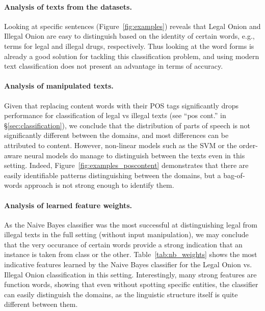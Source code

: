 \documentclass[11pt,a4paper,table]{article}
\begin{document}
  \paragraph{Analysis of texts from the datasets.}

    Looking at specific sentences (Figure~\ref{fig:examples})
    reveals that Legal Onion and Illegal Onion are easy to distinguish
    based on the identity of certain words, e.g., terms for legal and illegal drugs,
    respectively.
    Thus looking at the word forms is already a good solution for tackling this
    classification problem,
    and using modern text classification does not present an advantage in
    terms of accuracy.

  \paragraph{Analysis of manipulated texts.}

    Given that replacing content words with their POS tags significantly drops
    performance for classification of legal vs illegal texts
    (see ``pos cont.'' in \S\ref{sec:classification}),
    we conclude that the distribution of parts of speech is not significantly
    different between the domains,
    and most differences can be attributed to content.
    However, non-linear models such as the SVM or the order-aware neural models
    do manage to distinguish between the texts even in this setting.
    Indeed, Figure~\ref{fig:examples_poscontent} demonstrates that
    there are easily identifiable patterns distinguishing between the domains,
    but a bag-of-words approach is not strong enough to identify them. 

  \paragraph{Analysis of learned feature weights.}

    As the Naive Bayes classifier was the most successful at distinguishing
    legal from illegal texts in the full setting (without input manipulation),
    we may conclude that the very occurance of certain words provide a strong indication
    that an instance is taken from class or the other.
    Table~\ref{tab:nb_weights} shows the most indicative features learned
    by the Naive Bayes classifier for the
    Legal Onion vs. Illegal Onion classification in this setting.
    Interestingly, many strong features are function words,
    showing that even without spotting specific entities,
    the classifier can easily distinguish the domains, as the linguistic structure itself
    is quite different between them.
\end{document}
